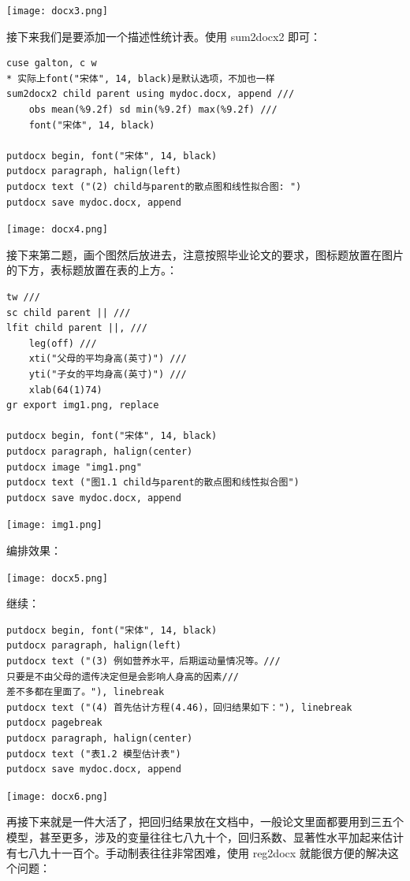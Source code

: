 \documentclass[cn,fancy,blue,11pt]{elegantbook}
\begin{document}
\noindent\texttt{[image: docx3.png]}

接下来我们是要添加一个描述性统计表。使用 sum2docx2 即可：

\begin{lstlisting}
cuse galton, c w
* 实际上font("宋体", 14, black)是默认选项，不加也一样
sum2docx2 child parent using mydoc.docx, append ///
    obs mean(%9.2f) sd min(%9.2f) max(%9.2f) ///
    font("宋体", 14, black)

putdocx begin, font("宋体", 14, black)
putdocx paragraph, halign(left)
putdocx text ("(2) child与parent的散点图和线性拟合图: ")
putdocx save mydoc.docx, append
\end{lstlisting}

\noindent\texttt{[image: docx4.png]}

接下来第二题，画个图然后放进去，注意按照毕业论文的要求，图标题放置在图片的下方，表标题放置在表的上方。：

\begin{lstlisting}
tw ///
sc child parent || ///
lfit child parent ||, ///
    leg(off) ///
    xti("父母的平均身高(英寸)") ///
    yti("子女的平均身高(英寸)") ///
    xlab(64(1)74)
gr export img1.png, replace

putdocx begin, font("宋体", 14, black)
putdocx paragraph, halign(center)
putdocx image "img1.png"
putdocx text ("图1.1 child与parent的散点图和线性拟合图")
putdocx save mydoc.docx, append
\end{lstlisting}

\noindent\texttt{[image: img1.png]}

编排效果：

\noindent\texttt{[image: docx5.png]}

继续：

\begin{lstlisting}
putdocx begin, font("宋体", 14, black)
putdocx paragraph, halign(left)
putdocx text ("(3) 例如营养水平，后期运动量情况等。///
只要是不由父母的遗传决定但是会影响人身高的因素///
差不多都在里面了。"), linebreak
putdocx text ("(4) 首先估计方程(4.46)，回归结果如下："), linebreak
putdocx pagebreak
putdocx paragraph, halign(center)
putdocx text ("表1.2 模型估计表")
putdocx save mydoc.docx, append
\end{lstlisting}

\noindent\texttt{[image: docx6.png]}

再接下来就是一件大活了，把回归结果放在文档中，一般论文里面都要用到三五个模型，甚至更多，涉及的变量往往七八九十个，回归系数、显著性水平加起来估计有七八九十一百个。手动制表往往非常困难，使用 reg2docx 就能很方便的解决这个问题：
\end{document}
